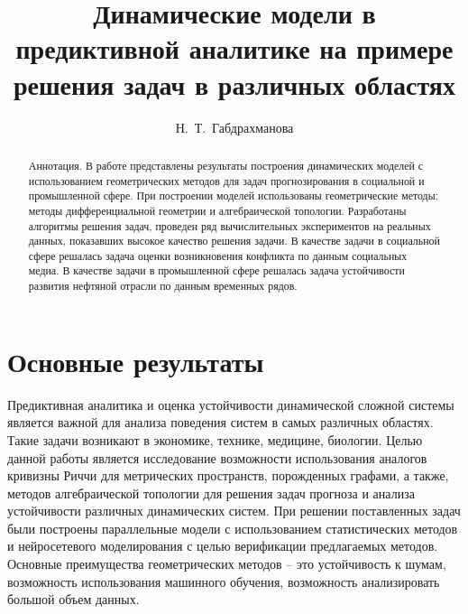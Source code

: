 \usepackage{todonotes} 

\usepackage[russian]{nla}


\fi

\title{Динамические модели в предиктивной аналитике на примере решения задач в различных областях}
\author{Н.~Т.~Габдрахманова
}

\institute{РУДН им. Патриса Лумумбы, Москва, РФ \\
 \email{gabdrakhmanova-nt@rudn.ru}
}

\maketitle

\begin{abstract}
Аннотация.  В работе представлены результаты построения динамических моделей с использованием геометрических методов для задач прогнозирования в социальной и промышленной сфере. При построении моделей использованы геометрические методы: методы дифференциальной геометрии и алгебраической топологии. Разработаны алгоритмы решения задач, проведен ряд вычислительных экспериментов на реальных данных, показавших высокое качество решения задачи. В качестве задачи в социальной сфере решалась задача оценки возникновения конфликта по данным социальных медиа. В качестве задачи в промышленной сфере решалась задача устойчивости развития нефтяной отрасли по данным временных рядов. 

\end{abstract}

\section{Основные результаты} %

Предиктивная аналитика и оценка устойчивости динамической сложной системы является важной для анализа поведения систем в самых различных областях. Такие задачи возникают в экономике, технике, медицине, биологии. Целью данной работы является исследование возможности использования аналогов кривизны Риччи для метрических пространств, порожденных графами, а также, методов алгебраической топологии для решения задач прогноза и анализа устойчивости различных динамических систем. При решении поставленных задач были построены параллельные модели с использованием статистических методов и нейросетевого моделирования с целью верификации предлагаемых методов. Основные преимущества геометрических методов – это устойчивость к шумам, возможность использования машинного обучения, возможность анализировать большой объем данных.

